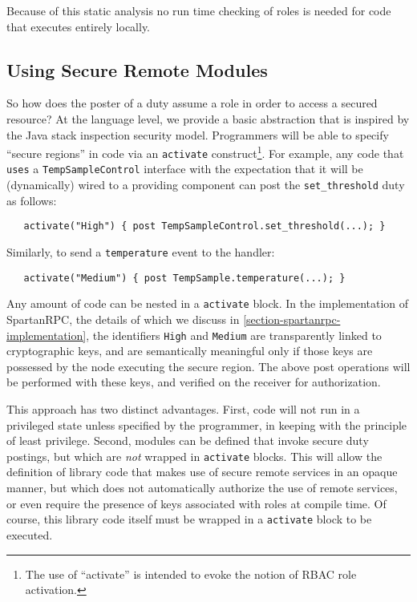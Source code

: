 Because of this static analysis no run time checking of roles is needed for code that executes
entirely locally.

\subsection{Using Secure Remote Modules} 

So how does the poster of a duty assume a role in order to access a secured resource? At the
language level, we provide a basic abstraction that is inspired by the Java stack inspection
security model. Programmers will be able to specify ``secure regions'' in code via an
\texttt{activate} construct\footnote{The use of ``activate'' is intended to evoke the notion of
  RBAC role activation.}. For example, any code that \texttt{uses} a \texttt{TempSampleControl}
interface with the expectation that it will be (dynamically) wired to a providing component can
post the \texttt{set\_threshold} duty as follows:
\begin{verbatim}
   activate("High") { post TempSampleControl.set_threshold(...); }
\end{verbatim}
Similarly, to send a \texttt{temperature} event to the handler:
\begin{verbatim}
   activate("Medium") { post TempSample.temperature(...); }
\end{verbatim}
Any amount of code can be nested in a \texttt{activate} block. In the implementation of
SpartanRPC, the details of which we discuss in \autoref{section-spartanrpc-implementation}, the
identifiers \texttt{High} and \texttt{Medium} are transparently linked to cryptographic keys,
and are semantically meaningful only if those keys are possessed by the node executing the
secure region. The above post operations will be performed with these keys, and verified on the
receiver for authorization.

This approach has two distinct advantages. First, code will not run in a privileged state unless
specified by the programmer, in keeping with the principle of least privilege. Second, modules
can be defined that invoke secure duty postings, but which are \emph{not} wrapped in
\texttt{activate} blocks. This will allow the definition of library code that makes use of
secure remote services in an opaque manner, but which does not automatically authorize the use
of remote services, or even require the presence of keys associated with roles at compile time.
Of course, this library code itself must be wrapped in a \texttt{activate} block to be executed.

